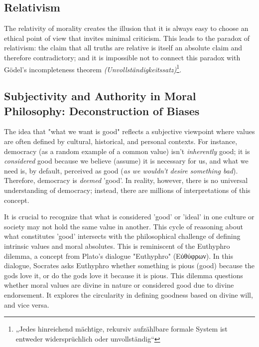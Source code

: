 \documentclass[11pt,a4]{article}
\newcommand{\textgreek}[1]{\begingroup\fontencoding{LGR}\selectfont#1\endgroup}
\begin{document}
\subsection{Relativism}
    The relativity of morality creates the illusion that it is always
    easy to choose an ethical point of view that invites minimal criticism.
    This leads to the paradox of relativism\cite{Meiland1980-ho}: the claim that all truths
    are relative is itself an absolute claim and therefore contradictory;
    and it is impossible not to connect this paradox with Gödel's
    incompleteness theorem \textit{(Unvollständigkeitssatz)}\footnote{„Jedes
    hinreichend mächtige, rekursiv aufzählbare formale System ist
    entweder widersprüchlich oder unvollständig“}.

\subsection{Subjectivity and Authority in Moral Philosophy: Deconstruction of Biases}
    The idea that "what we want is good" reflects a subjective viewpoint
    where values are often defined by cultural, historical, and personal
    contexts. For instance, democracy (as a random example of a common value) isn't \textit{inherently} good; it is \textit{considered} good because we
    believe (assume) it is necessary for us, and what we need is, by
    default, perceived as good (\textit{as we wouldn't desire something
    bad}). Therefore, democracy is \textit{deemed} 'good'. In reality,
    however, there is no universal understanding of democracy;
    instead, there are millions of interpretations of this concept.
    \par

    It is crucial to recognize that what is considered
    'good' or 'ideal' in one culture or society may not
    hold the same value in another.
    This cycle of reasoning about what constitutes 'good'
    intersects with the philosophical challenge of defining
    intrinsic values and moral absolutes. This is reminiscent
    of the Euthyphro dilemma, a concept from Plato's
    dialogue "Euthyphro" \textgreek{(Εὐθύφρων)}. In this
    dialogue, Socrates asks Euthyphro whether something is
    pious (good) because the gods love it, or do the
    gods love it because it is pious. This dilemma
    questions whether moral values are divine in nature or
    considered good due to divine endorsement. It explores
    the circularity in defining goodness based on divine
    will, and vice versa.
\end{document}
